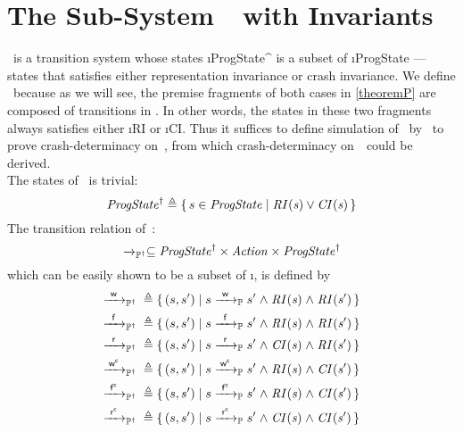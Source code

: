 \section{The Sub-System~\ProgInv\ with Invariants}
\label{sec:ProgInv}
\ProgInv\ is a transition system whose states \i{ProgState^\dagger} is a subset of \i{ProgState} \---- states that satisfies either representation invariance or crash invariance. We define \ProgInv\ because as we will see, the premise fragments of both cases in \cref{theoremP} are composed of transitions in \ProgInv. In other words, the states in these two fragments always satisfies either \i{RI} or \i{CI}. Thus it suffices to define simulation of \ProgInv\ by \Spec\ to prove crash-determinacy on~\ProgInv, from which crash-determinacy on~\Prog\ could be derived. \\
The states of \ProgInv\ is trivial:
$$\mathit{ProgState^{\dagger}} {}\triangleq{}{} \{\, s \in \mathit{ProgState} \mid \mathit{RI(s) \lor CI(s)} \,\}$$
The transition relation of~\ProgInv:
$$\xrightarrow{}_{\mathbb P^\dagger} \subseteq \mathit{ProgState^\dagger} \times \mathit{Action} \times \mathit{ProgState^\dagger}$$
which can be easily shown to be a subset of \i{\ttP{}}, is defined by
\begin{alignat*}{3}
	\ttPI{\awa{w}\actw} \defeq{}& \{\, (s, s') \mid s \ttP{\awa{w}\actw} s' \conj \i{RI(s)} \conj \i{RI(s')} \,\} \\
	\ttPI{\awa{w}\actf} \defeq{}& \{\, (s, s') \mid s \ttP{\awa{w}\actf} s' \conj \i{RI(s)} \conj \i{RI(s')} \,\} \\
	\ttPI{\awa{w}\actr} \defeq{}& \{\, (s, s') \mid s \ttP{\awa{w}\actr} s' \conj \i{CI(s)} \conj \i{RI(s')} \,\} \\
	\ttPI{\awa{w}\actwc} \defeq{}& \{\, (s, s') \mid s \ttP{\awa{w}\actwc} s' \conj \i{RI(s)} \conj \i{CI(s')} \,\} \\
	\ttPI{\awa{w}\actfc} \defeq{}& \{\, (s, s') \mid s \ttP{\awa{w}\actfc} s' \conj \i{RI(s)} \conj \i{CI(s')} \,\} \\
	\ttPI{\awa{w}\actrc} \defeq{}& \{\, (s, s') \mid s \ttP{\awa{w}\actrc} s' \conj \i{CI(s)} \conj \i{CI(s')} \,\} 
\end{alignat*}

